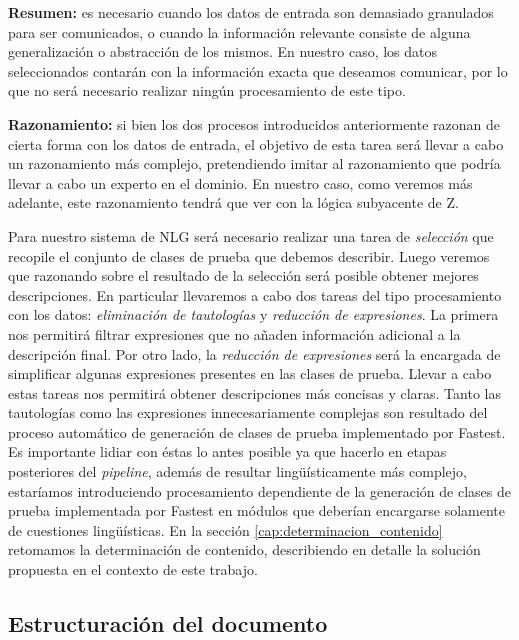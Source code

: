 \bigskip
\noindent
\textbf{Resumen:} es necesario cuando los datos de entrada son demasiado granulados para ser comunicados, o cuando la información relevante consiste de alguna generalización o abstracción de los mismos. En nuestro caso, los datos seleccionados contarán con la información exacta que deseamos comunicar, por lo que no será necesario realizar ningún procesamiento de este tipo.

\bigskip
\noindent
\textbf{Razonamiento:} si bien los dos procesos introducidos anteriormente razonan de cierta forma con los datos de entrada, el objetivo de esta tarea será llevar a cabo un razonamiento más complejo, pretendiendo imitar al razonamiento que podría llevar a cabo un experto en el dominio. En nuestro caso, como veremos más adelante, este razonamiento tendrá que ver con la lógica subyacente de Z.

\bigskip
Para nuestro sistema de NLG será necesario realizar una tarea de \emph{selección} que recopile el conjunto de clases de prueba que debemos describir. Luego veremos que razonando sobre el resultado de la selección será posible obtener mejores descripciones. En particular llevaremos a cabo dos tareas del tipo procesamiento con los datos: \emph{eliminación de tautologías} y \emph{reducción de expresiones}. La primera nos permitirá filtrar expresiones que no añaden información adicional a la descripción final. Por otro lado, la \emph{reducción de expresiones} será la encargada de simplificar algunas expresiones presentes en las clases de prueba. Llevar a cabo estas tareas nos permitirá obtener descripciones más concisas y claras. Tanto las tautologías como las expresiones innecesariamente complejas son resultado del proceso automático de generación de clases de prueba implementado por Fastest. Es importante lidiar con éstas lo antes posible ya que hacerlo en etapas posteriores del \textit{pipeline}, además de resultar lingüísticamente más complejo, estaríamos introduciendo procesamiento dependiente de la generación de clases de prueba implementada por Fastest en módulos que deberían encargarse solamente de cuestiones lingüísticas. En la sección \ref{cap:determinacion_contenido} retomamos la determinación de contenido, describiendo en detalle la solución propuesta en el contexto de este trabajo.

\subsection*{Estructuración del documento}

